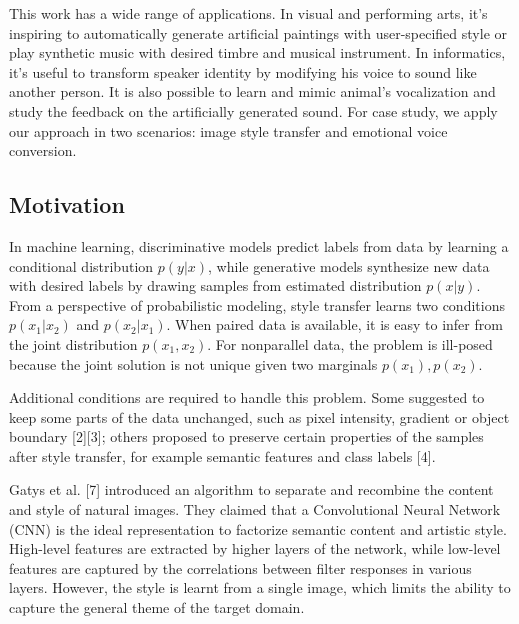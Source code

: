 \documentclass{article}
\begin{document}
This work has a wide range of applications. In visual and performing arts, it's inspiring to automatically generate artificial paintings with user-specified style or play synthetic music with desired timbre and musical instrument. In informatics, it's useful to transform speaker identity by modifying his voice to sound like another person. It is also possible to learn and mimic animal's vocalization and study the feedback on the artificially generated sound. For case study, we apply our approach in two scenarios: image style transfer and emotional voice conversion.

\subsection{Motivation} %
In machine learning, discriminative models predict labels from data by learning a conditional distribution $p(y|x)$, while generative models {\color{blue} synthesize} new data with desired labels by drawing samples from estimated distribution $p(x|y)$. From a perspective of probabilistic modeling, style transfer learns two conditions $p(x_1|x_2)$ and $p(x_2|x_1)$. When paired data is available, it is easy to infer from the joint distribution $p(x_1,x_2)$. For nonparallel data, the problem is ill-posed because the joint solution is not unique given two marginals $p(x_1), p(x_2)$.

Additional conditions are required to handle this problem. Some suggested to keep some parts of the data unchanged, such as pixel intensity, gradient or object boundary [2][3]; others proposed to preserve certain properties of the samples after style transfer, for example semantic features and class labels [4].

Gatys et al. [7] introduced an algorithm to separate and recombine the content and style of natural images. They claimed that a Convolutional Neural Network (CNN) is the ideal representation to factorize semantic content and artistic style. High-level features are extracted by higher layers of the network, while low-level features are captured by the correlations between filter responses in various layers. However, the style is learnt from a single image, which limits the ability to capture the general theme of the target domain.
\end{document}
